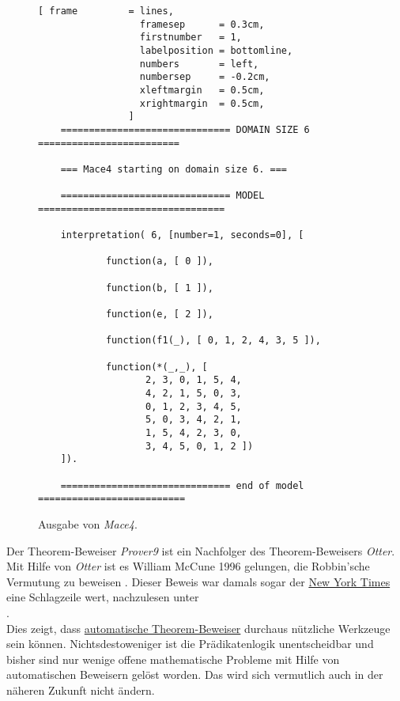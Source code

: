 \begin{figure}[!ht]
\centering
\begin{Verbatim}[ frame         = lines, 
                  framesep      = 0.3cm, 
                  firstnumber   = 1,
                  labelposition = bottomline,
                  numbers       = left,
                  numbersep     = -0.2cm,
                  xleftmargin   = 0.5cm,
                  xrightmargin  = 0.5cm,
                ]
    ============================== DOMAIN SIZE 6 =========================
    
    === Mace4 starting on domain size 6. ===
    
    ============================== MODEL =================================
    
    interpretation( 6, [number=1, seconds=0], [
    
            function(a, [ 0 ]),
    
            function(b, [ 1 ]),
    
            function(e, [ 2 ]),
    
            function(f1(_), [ 0, 1, 2, 4, 3, 5 ]),
    
            function(*(_,_), [
    			   2, 3, 0, 1, 5, 4,
    			   4, 2, 1, 5, 0, 3,
    			   0, 1, 2, 3, 4, 5,
    			   5, 0, 3, 4, 2, 1,
    			   1, 5, 4, 2, 3, 0,
    			   3, 4, 5, 0, 1, 2 ])
    ]).
    
    ============================== end of model ==========================
\end{Verbatim}
\vspace*{-0.3cm}
\caption{Ausgabe von \textsl{Mace4}.}
\label{fig:group.out}
\end{figure}

\remark
Der Theorem-Beweiser \textsl{Prover9} ist ein Nachfolger des Theorem-Beweisers \textsl{Otter}.  Mit Hilfe von
\textsl{Otter} ist es William McCune 1996 gelungen, die Robbin'sche Vermutung zu beweisen \cite{mccune:1997}.
Dieser Beweis war damals sogar der \href{http://www.nytimes.com/}{New York Times} eine Schlagzeile wert,
nachzulesen unter
\\[0.2cm]
\hspace*{1.3cm}
\href{http://www.nytimes.com/library/cyber/week/1210math.html}{}.
\\[0.2cm]
Dies zeigt, dass \href{https://en.wikipedia.org/wiki/Automated_theorem_proving}{automatische Theorem-Beweiser}
durchaus nützliche Werkzeuge sein können.  Nichtsdestoweniger ist die Prädikatenlogik unentscheidbar und bisher
sind  nur wenige offene mathematische Probleme mit Hilfe von automatischen Beweisern gelöst worden.  Das wird
sich vermutlich auch in der näheren Zukunft nicht ändern.  \eox

